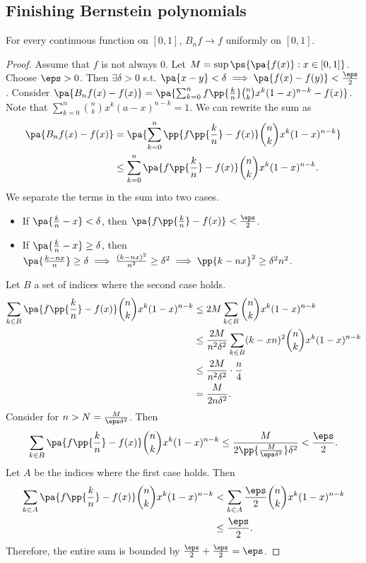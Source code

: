 \documentclass[11pt]{scrartcl}
\numberwithin{equation}{section}
\begin{document}
\subsection{Finishing Bernstein polynomials}
\begin{theorem}
    \label{thm:bernstein-convergence}
    For every continuous function on $[0,1]$, $B_nf\to f$ uniformly
    on $[0,1]$.
\end{theorem}
\begin{proof}
    Assume that $f$ is not always $0$. Let 
    $M=\sup\ps{\pa{f(x)}: x\in [0,1]}$.
    Choose $\eps>0$. Then $\exists \delta>0$ s.t. $\pa{x-y}<\delta
    \implies \pa{f(x)-f(y)}<\frac{\eps}{2}$.
    Consider
    $\pa{B_nf(x)-f(x)} = \pa{\sum_{k=0}^{n}f\pp{\frac{k}{n}}\binom{n}{k}x^k(1-x)^{n-k}-f(x)}$. Note that $\sum_{k=0}^{n}\binom{n}{k}x^k(a-x)^{n-k}=1$. We can rewrite the sum as 
    \begin{align*}
        \pa{B_nf(x)-f(x)} &= \pa{\sum_{k=0}^{n}\pp{f\pp{\frac{k}{n}} - f(x)} \binom{n}{k} x^k (1-x)^{n-k}} \\ 
        &\leq \sum_{k=0}^{n}\pa{f\pp{\frac{k}{n}} - f(x)} \binom{n}{k} x^k (1-x)^{n-k}.
    \end{align*}
    We separate the terms in the sum into two cases.
    \begin{itemize}
        \item If $\pa{\frac{k}{n}-x}<\delta$, then 
        $\pa{f\pp{\frac{k}{n}}-f(x)}<\frac{\eps}{2}$.
        \item If $\pa{\frac{k}{n}-x}\geq\delta$, then 
        $\pa{\frac{k-nx}{n}}\geq \delta \implies 
        \frac{(k-nx)^2}{n^2}\geq\delta^2 \implies \pp{k-nx}^2\geq \delta^2n^2$.
    \end{itemize}
    Let $B$ a set of indices where the second case holds.
    \begin{align*}
        \sum_{k\in B}\pa{f\pp{\frac{k}{n}} - f(x)} \binom{n}{k} x^k (1-x)^{n-k}
        &\leq 2M\sum_{k\in B}\binom{n}{k} x^k (1-x)^{n-k} \\
        &\leq \frac{2M}{n^2\delta^2}\sum_{k\in B}(k-xn)^2\binom{n}{k} x^k (1-x)^{n-k} \\
        &\leq \frac{2M}{n^2\delta^2}\cdot\frac{n}{4} \\
        &= \frac{M}{2n\delta^2}.
    \end{align*}
    Consider for $n>N=\frac{M}{\eps\delta^2}$.
    Then 
    \[
        \sum_{k\in B}\pa{f\pp{\frac{k}{n}} - f(x)} \binom{n}{k} x^k (1-x)^{n-k}\leq \frac{M}{2\pp{\frac{M}{\eps\delta^2}}\delta^2} < \frac{\eps}{2}.
    \]
    Let $A$ be the indices where the first case holds.
    Then 
    \begin{align*}
        \sum_{k\in A}
        \pa{f\pp{\frac{k}{n}} - f(x)} \binom{n}{k} x^k (1-x)^{n-k}
        &<
        \sum_{k\in A} \frac{\eps}{2} \binom{n}{k} x^k (1-x)^{n-k}\\
        &\leq 
        \frac{\eps}{2}.
    \end{align*}
    Therefore, the entire sum is bounded by 
    $\frac{\eps}{2}+\frac{\eps}{2}=\eps$.
\end{proof}
\end{document}
